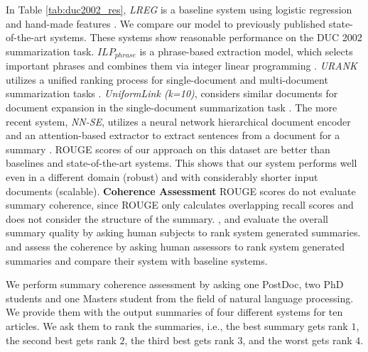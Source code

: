 In Table \ref{tab:duc2002_res}, \emph{LREG} is a baseline system using logistic regression and hand-made features \cite{jianpeng15}.
We compare our model to previously published state-of-the-art systems. These systems
show reasonable performance on the DUC 2002 summarization task.
\emph{$ILP_{phrase}$} is a phrase-based extraction model, which selects important phrases and combines them via integer linear programming \cite{woodsend10}.
\emph{URANK} utilizes a unified ranking process for single-document and multi-document summarization tasks \cite{wanxiaojun10b}.
\emph{UniformLink (k=10)}, considers similar documents for document expansion in the single-document summarization task \cite{wanxiaojun10a}.
The more recent system, \emph{NN-SE}, utilizes a neural network hierarchical document encoder and an attention-based extractor to extract sentences from a document for a summary \cite{jianpeng15}.
ROUGE scores of our approach on this dataset are better than baselines %
and state-of-the-art systems. %
This shows that our system performs well even in a different domain (robust) and with considerably shorter input documents (scalable).
%
\textbf{Coherence Assessment}
%
\noindent
ROUGE scores do not evaluate summary coherence, since ROUGE only calculates overlapping recall scores and does not consider the structure of the summary.
,  and  evaluate the overall summary quality by asking human subjects to rank system generated summaries.
 and  assess the coherence by asking human assessors to rank system generated summaries and compare their system with baseline systems.

We perform summary coherence assessment by asking one PostDoc, two PhD students and one Masters student from the field of natural language processing. We provide them with the output summaries of four different systems for ten articles. We ask them to rank the summaries, i.e., the best summary gets rank $1$, the second best gets rank $2$, the third best gets rank $3$, and the worst gets rank $4$.

